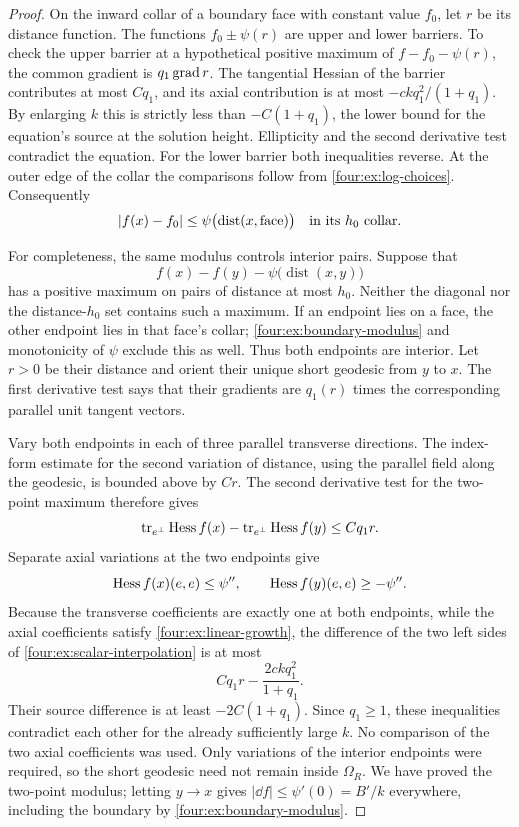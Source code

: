 \begin{proof}
On the inward collar of a boundary face with constant value $f_0$,
let $r$ be its distance function.  The functions
$f_0\pm\psi(r)$ are upper and lower barriers.  To check the upper
barrier at a hypothetical positive maximum of
$f-f_0-\psi(r)$, the common gradient is $q_1\operatorname{grad} r$.  The tangential
Hessian of the barrier contributes at most $Cq_1$, and its axial
contribution is at most $-ckq_1^2/(1+q_1)$.  By enlarging $k$ this is
strictly less than $-C(1+q_1)$, the lower bound for the equation's
source at the solution height.  Ellipticity and the second derivative
test contradict the equation.  For the lower barrier both inequalities
reverse.  At the outer edge of the collar the comparisons follow from
\eqref{four:ex:log-choices}.  Consequently
\begin{equation}\label{four:ex:boundary-modulus}
 |f(x)-f_0|\le\psi\bigl(\operatorname{dist}(x,\mathrm{face})\bigr)
 \quad\hbox{in its $h_0$ collar}.
\end{equation}

For completeness, the same modulus controls interior pairs.  Suppose
that
\[
 f(x)-f(y)-\psi\bigl(\operatorname{dist}(x,y)\bigr)
\]
has a positive maximum on pairs of distance at most $h_0$.  Neither
the diagonal nor the distance-$h_0$ set contains such a maximum.
If an endpoint lies on a face, the other endpoint lies in that face's
collar; \eqref{four:ex:boundary-modulus} and monotonicity of $\psi$ exclude
this as well.  Thus both endpoints are interior.  Let $r>0$ be their
distance and orient their unique short geodesic from $y$ to $x$.
The first derivative test says that their gradients are $q_1(r)$ times
the corresponding parallel unit tangent vectors.

Vary both endpoints in each of three parallel transverse directions.
The index-form estimate for the second variation of distance, using
the parallel field along the geodesic, is bounded above by $Cr$.
The second derivative test for the two-point maximum therefore gives
\[
 \operatorname{tr}_{e^\perp}\operatorname{Hess} f(x)-\operatorname{tr}_{e^\perp}\operatorname{Hess} f(y)
 \le Cq_1r.
\]
Separate axial variations at the two endpoints give
\[
 \operatorname{Hess} f(x)(e,e)\le\psi'',\qquad
 \operatorname{Hess} f(y)(e,e)\ge-\psi''.
\]
Because the transverse coefficients are exactly one at both endpoints,
while the axial coefficients satisfy \eqref{four:ex:linear-growth}, the
difference of the two left sides of \eqref{four:ex:scalar-interpolation} is
at most
\[
 Cq_1r-\frac{2ckq_1^2}{1+q_1}.
\]
Their source difference is at least $-2C(1+q_1)$.  Since $q_1\ge1$,
these inequalities contradict each other for the already sufficiently
large $k$.  No comparison of the two axial coefficients was used.
Only variations of the interior endpoints were required, so the
short geodesic need not remain inside $\Omega_R$.
We have proved the two-point modulus; letting $y\to x$ gives
$|\dd f|\le\psi'(0)=B'/k$ everywhere, including the boundary by
\eqref{four:ex:boundary-modulus}.


\end{proof}
